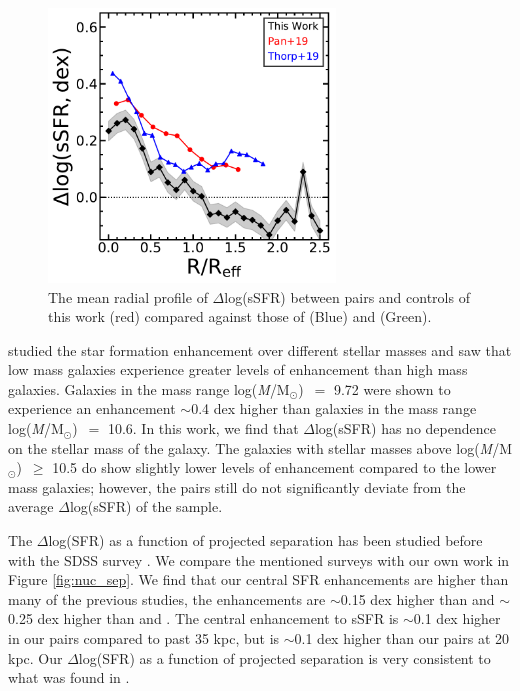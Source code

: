 \documentclass[iop,revtex4,twocolumn,apj,numberedappendix,appendixfloats]{emulateapj}
\newcommand{\logm}{log({\it M}/M$_{\odot}$)}
\begin{document}
\begin{figure}
\centering
\includegraphics[width=3in]{fig/prof_comp.pdf}
\caption[]{The mean radial profile of $\Delta$log(sSFR) between pairs and controls of this work (red) compared against those of \citet{Pan:2019} (Blue) and \citet{Thorp:2019} (Green).}
\label{fig:prof_comp}
\end{figure}

\citet{Li:2008} studied the star formation enhancement over different stellar masses and saw that low mass galaxies experience greater levels of enhancement than high mass galaxies.  Galaxies in the mass range \logm\ $=$ 9.72 were shown to experience an enhancement $\sim$0.4 dex higher than galaxies in the mass range \logm\ $=$ 10.6. In this work, we find that $\Delta$log(sSFR) has no dependence on the stellar mass of the galaxy. The galaxies with stellar masses above \logm\ $\ge$ 10.5 do show slightly lower levels of enhancement compared to the lower mass galaxies; however, the pairs still do not significantly deviate from the average $\Delta$log(sSFR) of the sample.

The $\Delta$log(SFR) as a function of projected separation has been studied before with the SDSS survey \citep{Ellison:2008, Li:2008, Patton:2013, Scudder:2012, Bustamante:2020}. We compare the mentioned surveys with our own work in Figure \ref{fig:nuc_sep}. We find that our central SFR enhancements are higher than many of the previous studies, the enhancements are $\sim$0.15 dex higher than \citet{Scudder:2012} and $\sim$0.25 dex higher than \citet{Ellison:2008} and \citet{Bustamante:2020}. The central enhancement to sSFR is $\sim$0.1 dex higher in our pairs compared to \citet{Li:2008} past 35 kpc, but \citet{Li:2008} is $\sim$0.1 dex higher than our pairs at 20 kpc.  Our $\Delta$log(SFR) as a function of projected separation is very consistent to what was found in \citet{Patton:2013}.
\end{document}
